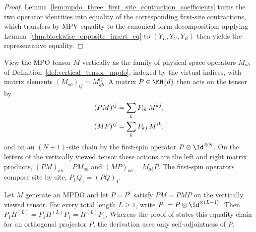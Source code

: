 \begin{proof}
    \leanok
    Lemma~\ref{lem:mpdo_three_first_site_contraction_coefficients} turns the
    two operator identities into equality of the corresponding first-site
    contractions, which transfers by MPV equality to the canonical-form
    decomposition; applying Lemma~\ref{thm:blockwise_opposite_insert_eq} to
    $(Y_L,Y_C,Y_R)$ then yields the representative equality.
\end{proof}

\begin{definition}
    \label{def:mpdo_vertical_one_site_actions}
    \leanok
    View the MPO tensor $M$ vertically as the family of physical-space
    operators $M_{ab}$ of Definition~\ref{def:vertical_tensor_mpdo}, indexed
    by the virtual indices, with matrix elements
    $(M_{ab})_{ij}=M^{ij}_{ab}$. A matrix $P\in \MN{d}$ then acts on the
    tensor by
    \begin{align}
        (PM)^{ij}
         & =\sum_k P_{ik}\,M^{kj},
        \notag                     \\
        (MP)^{ij}
         & =\sum_k P_{kj}\,M^{ik},
        \notag
    \end{align}
    and on an $(N+1)$-site chain by the first-spin operator
    $P\otimes\Id^{\otimes N}$. On the letters of the vertically viewed
    tensor these actions are the left and right matrix products,
    $(PM)_{ab}=PM_{ab}$ and $(MP)_{ab}=M_{ab}P$. The first-spin operators
    compose site by site, $P_1Q_1=(PQ)_1$.
\end{definition}

\begin{lemma}
    \label{thm:mpdo_first_site_invariant_comm}
    \leanok
    Let $M$ generate an MPDO and let $P=P^\dagger$ satisfy $PM=PMP$ on the
    vertically viewed tensor. For every total length $L\geq1$, write
    $P_1=P\otimes\Id^{\otimes(L-1)}$. Then
    $P_1H^{(L)}=P_1H^{(L)}P_1=H^{(L)}P_1$.
    Whereas the proof of \cite[Proposition~4.13]{Cirac2016MPDO_arXiv} states
    this equality chain for an orthogonal projector $P$, the derivation uses
    only self-adjointness of $P$.
\end{lemma}

